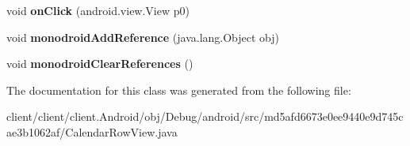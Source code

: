 \begin{DoxyCompactItemize}
\item 
\hypertarget{classmd5afd6673e0ee9440e9d745cae3b1062af_1_1CalendarRowView_a5190e718e3a826d24b08fc6ee4671fe9}{}void {\bfseries on\+Click} (android.\+view.\+View p0)\label{classmd5afd6673e0ee9440e9d745cae3b1062af_1_1CalendarRowView_a5190e718e3a826d24b08fc6ee4671fe9}

\item 
\hypertarget{classmd5afd6673e0ee9440e9d745cae3b1062af_1_1CalendarRowView_a1f9befb69793b7d6ee85d9ef08e05d93}{}void {\bfseries monodroid\+Add\+Reference} (java.\+lang.\+Object obj)\label{classmd5afd6673e0ee9440e9d745cae3b1062af_1_1CalendarRowView_a1f9befb69793b7d6ee85d9ef08e05d93}

\item 
\hypertarget{classmd5afd6673e0ee9440e9d745cae3b1062af_1_1CalendarRowView_ab3d88505280956f0bb9d56b169d1b176}{}void {\bfseries monodroid\+Clear\+References} ()\label{classmd5afd6673e0ee9440e9d745cae3b1062af_1_1CalendarRowView_ab3d88505280956f0bb9d56b169d1b176}

\end{DoxyCompactItemize}


The documentation for this class was generated from the following file\+:\begin{DoxyCompactItemize}
\item 
client/client/client.\+Android/obj/\+Debug/android/src/md5afd6673e0ee9440e9d745cae3b1062af/Calendar\+Row\+View.\+java\end{DoxyCompactItemize}
